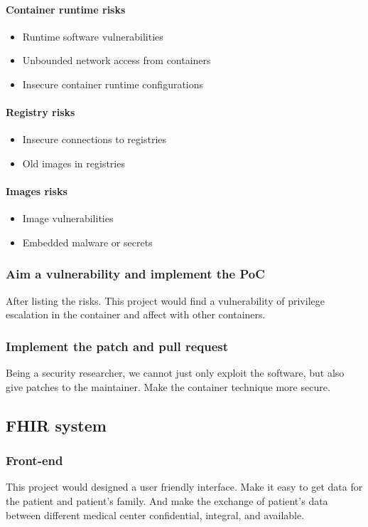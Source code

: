 \documentclass[12pt,a4paper]{IEEEconf}
\begin{document}
\paragraph{Container runtime risks}
\begin{itemize}
  \item Runtime software vulnerabilities
  \item Unbounded network access from containers
  \item Insecure container runtime configurations
\end{itemize}

\paragraph{Registry risks}
\begin{itemize}
  \item Insecure connections to registries
  \item Old images in registries
\end{itemize}

\paragraph{Images risks}
\begin{itemize}
  \item Image vulnerabilities
  \item Embedded malware or secrets
\end{itemize}

\subsubsection{Aim a vulnerability and implement the PoC}
After listing the risks. This project would find a vulnerability of privilege escalation in
the container and affect with other containers.

\subsubsection{Implement the patch and pull request}
Being a security researcher, we cannot just only exploit the software, but also give patches to
the maintainer. Make the container technique more secure.

\subsection{FHIR system}
\subsubsection{Front-end}
This project would designed a user friendly interface. Make it easy to get data for the
patient and patient's family. And make the exchange of patient's data between different medical
center confidential, integral, and available.
\end{document}

